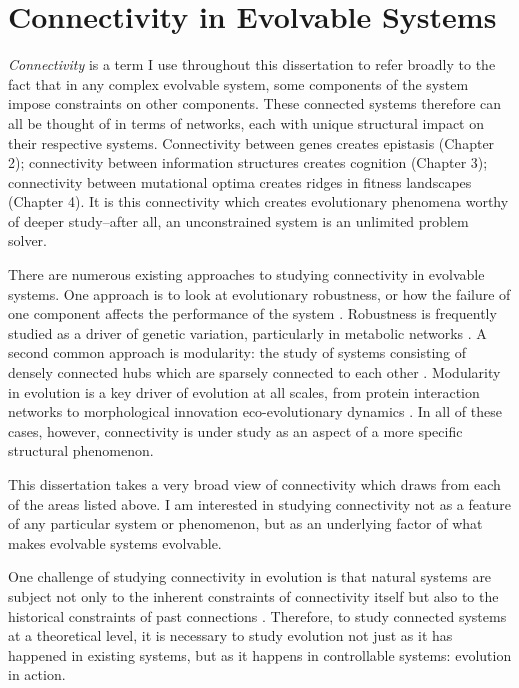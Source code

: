 \section{Connectivity in Evolvable Systems}

\textit{Connectivity} is a term I use throughout this dissertation to refer broadly to the fact that in any complex evolvable system, some components of the system impose constraints on other components. These connected systems therefore can all be thought of in terms of networks, each with unique structural impact on their respective systems. Connectivity between genes creates epistasis (Chapter 2); connectivity between information structures creates cognition (Chapter 3); connectivity between mutational optima creates ridges in fitness landscapes (Chapter 4). It is this connectivity which creates evolutionary phenomena worthy of deeper study--after all, an unconstrained system is an unlimited problem solver. 

There are numerous existing approaches to studying connectivity in evolvable systems. One approach is to look at evolutionary robustness, or how the failure of one component affects the performance of the system \citep{wagner_robustness_2007, masel_robustness_2009}. Robustness is frequently studied as a driver of genetic variation, particularly in metabolic networks \citep{handorf_expanding_2005, felix_robustness_2008}. A second common approach is modularity: the study of systems consisting of densely connected hubs which are sparsely connected to each other \citep{wagner_road_2007, clune_evolutionary_2013, melo_modularity_2016}. Modularity in evolution is a key driver of evolution at all scales, from
protein interaction networks \citep{han_evidence_2004} to
morphological innovation \citep{parsons_constraint_2012}
eco-evolutionary dynamics \citep{fletcher_network_2013}. In all of these cases, however, connectivity is under study as an aspect of a more specific structural phenomenon.

This dissertation takes a very broad view of connectivity which draws from each of the areas listed above. I am interested in studying connectivity not as a feature of any particular system or phenomenon, but as an underlying factor of what makes evolvable systems evolvable. 

One challenge of studying connectivity in evolution is that natural systems are subject not only to the inherent constraints of connectivity itself but also to the historical constraints of past connections \citep{blount_historical_2008}. Therefore, to study connected systems at a theoretical level, it is necessary to study evolution not just as it has happened in existing systems, but as it happens in controllable systems: evolution in action.